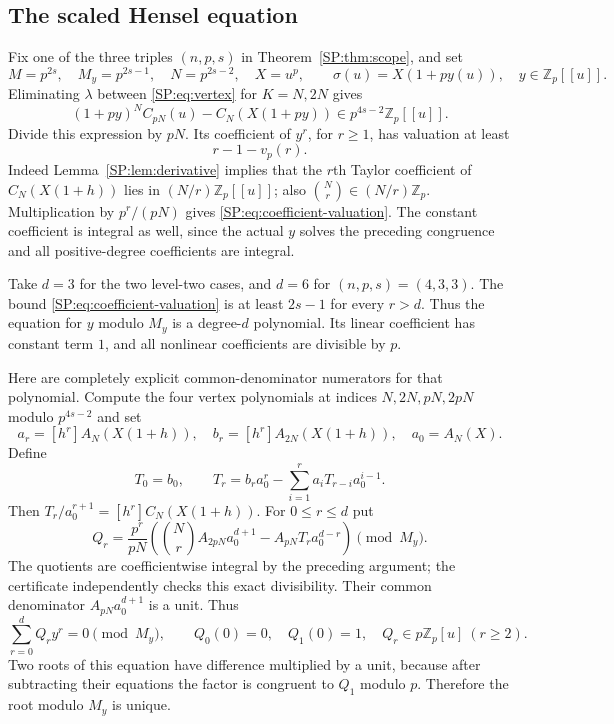 \documentclass[11pt,a4paper]{article}
\theoremstyle{definition}\newtheorem{definition}[theorem]{Definition}
\theoremstyle{remark}\newtheorem{remark}[theorem]{Remark}
\newcommand{\Z}{\mathbb Z}
\newcommand{\vp}{v_p}
\numberwithin{equation}{section}
\begin{document}
\subsection{The scaled Hensel equation}
Fix one of the three triples $(n,p,s)$ in Theorem~\ref{SP:thm:scope}, and set
\[
 M=p^{2s},\quad M_y=p^{2s-1},\quad N=p^{2s-2},\quad X=u^p,
 \qquad \sigma(u)=X(1+py(u)),\quad y\in\Z_p[[u]].
\]
Eliminating $\lambda$ between \eqref{SP:eq:vertex} for $K=N,2N$ gives
\[
 (1+py)^N C_{pN}(u)-C_N(X(1+py))
       \in p^{4s-2}\Z_p[[u]].
\]
Divide this expression by $pN$. Its coefficient of $y^r$, for $r\ge1$,
has valuation at least
\begin{equation}\label{SP:eq:coefficient-valuation}
 r-1-\vp(r).
\end{equation}
Indeed Lemma~\ref{SP:lem:derivative} implies that the $r$th Taylor
coefficient of $C_N(X(1+h))$ lies in $(N/r)\Z_p[[u]]$;
also $\binom Nr\in(N/r)\Z_p$. Multiplication by $p^r/(pN)$ gives
\eqref{SP:eq:coefficient-valuation}. The constant coefficient is integral
as well, since the actual $y$ solves the preceding congruence and all
positive-degree coefficients are integral.

Take $d=3$ for the two level-two cases, and $d=6$ for $(n,p,s)=(4,3,3)$.
The bound \eqref{SP:eq:coefficient-valuation} is at least $2s-1$ for every
$r>d$. Thus the equation for $y$ modulo $M_y$ is a degree-$d$ polynomial.
Its linear coefficient has constant term $1$, and all nonlinear
coefficients are divisible by $p$.

Here are completely explicit common-denominator numerators for that
polynomial. Compute the four vertex polynomials at indices
$N,2N,pN,2pN$ modulo $p^{4s-2}$ and set
\[
 a_r=[h^r]A_N(X(1+h)),\quad b_r=[h^r]A_{2N}(X(1+h)),
 \quad a_0=A_N(X).
\]
Define
\[
 T_0=b_0,\qquad
 T_r=b_ra_0^r-\sum_{i=1}^r a_iT_{r-i}a_0^{i-1}.
\]
Then $T_r/a_0^{r+1}=[h^r]C_N(X(1+h))$. For $0\le r\le d$ put
\begin{equation}\label{SP:eq:Qs}
 Q_r=\frac{p^r}{pN}
 \left(\binom Nr A_{2pN}a_0^{d+1}
             -A_{pN}T_ra_0^{d-r}\right)\pmod{M_y}.
\end{equation}
The quotients are coefficientwise integral by the preceding argument;
the certificate independently checks this exact divisibility.
Their common denominator $A_{pN}a_0^{d+1}$ is a unit. Thus
\begin{equation}\label{SP:eq:Hensel}
 \sum_{r=0}^d Q_r y^r=0\pmod{M_y},\qquad
 Q_0(0)=0,\quad Q_1(0)=1,\quad Q_r\in p\Z_p[u]\ (r\ge2).
\end{equation}
Two roots of this equation have difference multiplied by a unit,
because after subtracting their equations the factor is congruent to
$Q_1$ modulo $p$. Therefore the root modulo $M_y$ is unique.
\end{document}
